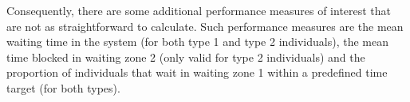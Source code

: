Consequently, there are some additional performance measures of interest that
are not as straightforward to calculate.
Such performance measures are the mean waiting time in the system (for both 
type 1 and type 2 individuals), the mean time blocked in waiting zone 2 (only 
valid for type 2 individuals) and the proportion of individuals that wait in 
waiting zone 1 within a predefined time target (for both types).





